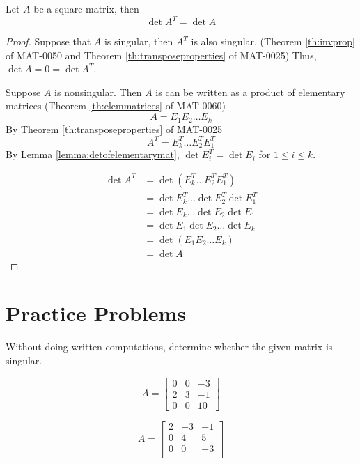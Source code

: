 \documentclass{ximera}
\begin{document}
\begin{theorem}\label{th:detoftrans}
Let $A$ be a square matrix, then
$$\det{A^T}=\det{A}$$
\end{theorem}

\begin{proof}
Suppose that $A$ is singular, then $A^T$ is also singular. (Theorem \ref{th:invprop} of MAT-0050 and Theorem \ref{th:transposeproperties} of MAT-0025) Thus, $\det{A}=0=\det{A^T}$.

Suppose $A$ is nonsingular.  Then $A$ is can be written as a product of elementary matrices (Theorem \ref{th:elemmatrices} of MAT-0060)
$$A=E_1E_2\ldots E_k$$
By Theorem \ref{th:transposeproperties} of MAT-0025
$$A^T=E_k^T\ldots E_2^TE_1^T$$
By Lemma \ref{lemma:detofelementarymat}, $\det{E_i^T}=\det{E_i}$ for $1\leq i\leq k$.

\begin{align*}
\det{A^T}&=\det{(E_k^T\ldots E_2^TE_1^T)}\\
&=\det{E_k^T}\ldots \det{E_2^T}\det{E_1^T}\\
&=\det{E_k}\ldots \det{E_2}\det{E_1}\\
&=\det{E_1}\det{E_2}\ldots\det{E_k}\\
&=\det{(E_1E_2\ldots E_k)}\\
&=\det{A}
\end{align*}
\end{proof}

\section*{Practice Problems}
\begin{problem}
Without doing written computations, determine whether the given matrix is singular. 
  \begin{problem}\label{prob:singmatrixdet1a}
  $$A=\begin{bmatrix}0&0&-3\\2&3&-1\\0&0&10\end{bmatrix}$$
  \begin{multipleChoice}
  \end{multipleChoice}
  \end{problem}

\begin{problem}\label{prob:singmatrixdet1b}
  $$A=\begin{bmatrix}2&-3&-1\\0&4&5\\0&0&-3\\\end{bmatrix}$$
  \begin{multipleChoice}
  \end{multipleChoice}
  \end{problem}

\end{problem}
\end{document}
